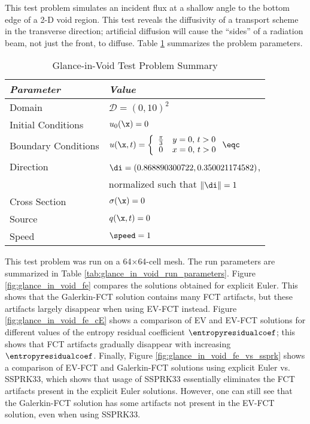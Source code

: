 This test problem simulates an incident flux at a shallow angle to
the bottom edge of a 2-D void region.
This test reveals the diffusivity of a transport scheme in the transverse
direction; artificial diffusion will cause the ``sides'' of a radiation beam,
not just the front, to diffuse.
Table \ref{tab:glance_in_void} summarizes the problem parameters.

\begin{table}[htb]\caption{Glance-in-Void Test Problem Summary}
\label{tab:glance_in_void}
\centering
\begin{tabular}{l l}\toprule
\emph{Parameter} & \emph{Value}\\\midrule
Domain & $\mathcal{D} = (0,10)^2$\\
Initial Conditions & $u_0(\x)=0$\\
Boundary Conditions & $u(\x,t)=\left\{\begin{array}{c c}
  \frac{\pi}{3} & y = 0, \, t > 0\\
  0             & x = 0, \, t > 0
  \end{array}\right. \eqc$\\
Direction & $\di = (0.868890300722,0.350021174582)$,\\
          & normalized such that $\|\di\| = 1$\\
Cross Section & $\sigma(\x)=0$\\
Source & $q(\x,t)=0$\\
Speed & $\speed=1$\\
\bottomrule\end{tabular}
\end{table}

This test problem was run on a 64$\times$64-cell mesh.
The run parameters are summarized in Table \ref{tab:glance_in_void_run_parameters}.
Figure \ref{fig:glance_in_void_fe} compares the solutions obtained
for explicit Euler. This shows that the Galerkin-FCT solution contains
many FCT artifacts, but these artifacts largely disappear when using
EV-FCT instead. Figure \ref{fig:glance_in_void_fe_cE} shows a comparison
of EV and EV-FCT solutions for different values of the 
entropy residual coefficient $\entropyresidualcoef$; this shows that FCT
artifacts gradually disappear with increasing $\entropyresidualcoef$.
Finally, Figure \ref{fig:glance_in_void_fe_vs_ssprk} shows a comparison
of EV-FCT and Galerkin-FCT solutions using explicit Euler vs. SSPRK33,
which shows that usage of SSPRK33 essentially eliminates the FCT artifacts
present in the explicit Euler solutions. However, one can still see that
the Galerkin-FCT solution has some artifacts not present in the EV-FCT
solution, even when using SSPRK33.

